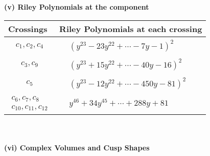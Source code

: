 \documentclass[1p]{elsarticle_modified}
\theoremstyle{definition}
\begin{document}
\newpage\renewcommand{\arraystretch}{1}
\flushleft \textbf{(v) Riley Polynomials at the component}\newline \\
\begin{tabular}{m{50pt}|m{274pt}}
Crossings & \hspace{64pt}Riley Polynomials at each crossing \\
\hline $$\begin{aligned}c_{1},c_{2},c_{4}\end{aligned}$$&$\begin{aligned}
&(y^{23}-23 y^{22}+\cdots-7 y-1)^{2}
\end{aligned}$\\
\hline $$\begin{aligned}c_{3},c_{9}\end{aligned}$$&$\begin{aligned}
&(y^{23}+15 y^{22}+\cdots-40 y-16)^{2}
\end{aligned}$\\
\hline $$\begin{aligned}c_{5}\end{aligned}$$&$\begin{aligned}
&(y^{23}-12 y^{22}+\cdots-450 y-81)^{2}
\end{aligned}$\\
\hline $$\begin{aligned}c_{6},c_{7},c_{8}\\c_{10},c_{11},c_{12}\end{aligned}$$&$\begin{aligned}
&y^{46}+34 y^{45}+\cdots+288 y+81
\end{aligned}$\\
\hline
\end{tabular}\\~\\
\newpage\flushleft \textbf{(vi) Complex Volumes and Cusp Shapes}
\end{document}
